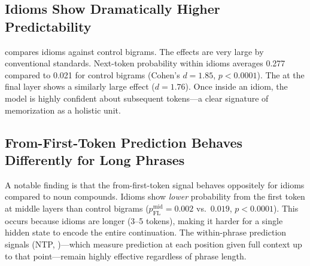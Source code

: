\subsection{Idioms Show Dramatically Higher Predictability}
\label{sec:results_idioms}

 compares \idiomem idioms against \comp control bigrams.
The effects are very large by conventional standards.
Next-token probability within idioms averages 0.277 compared to 0.021 for control bigrams (Cohen's $d = 1.85$, $p < 0.0001$).
The \logitlens at the final layer shows a similarly large effect ($d = 1.76$).
Once inside an idiom, the model is highly confident about subsequent tokens---a clear signature of memorization as a holistic unit.

\begin{table}[t]
\centering
\caption{Comparison of prediction metrics between \comp control bigrams ($n = 55$) and \idiomem idioms ($n = 852$). Effect sizes above 1.0 are \textbf{bolded}.}
\label{tab:idioms}
\vspace{4pt}
\end{table}

\subsection{From-First-Token Prediction Behaves Differently for Long Phrases}
\label{sec:results_futurelens}

A notable finding is that the \futurelens from-first-token signal behaves oppositely for idioms compared to noun compounds.
Idioms show \emph{lower} \futurelens probability from the first token at middle layers than control bigrams ($p_{\text{FL}}^{\text{mid}} = 0.002$ vs.\ $0.019$, $p < 0.0001$).
This occurs because idioms are longer (3--5 tokens), making it harder for a single hidden state to encode the entire continuation.
The within-phrase prediction signals (NTP, \logitlens)---which measure prediction at each position given full context up to that point---remain highly effective regardless of phrase length.

